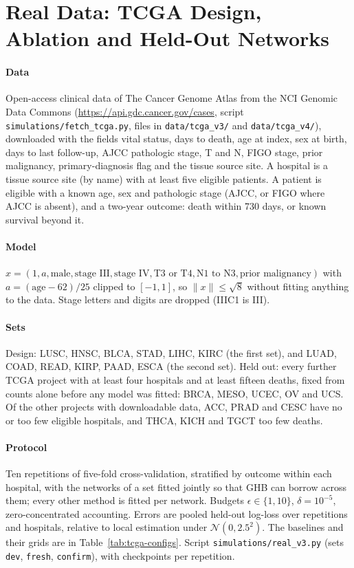 \documentclass[acmsmall,screen,nonacm]{acmart}
\theoremstyle{acmdefinition}
\begin{document}
\section{Real Data: TCGA Design, Ablation and Held-Out Networks}\label{sec:tcga}

\paragraph{Data} Open-access clinical data of The Cancer Genome Atlas \cite{weinstein2013cancer,grossman2016toward} from the NCI Genomic Data Commons (\url{https://api.gdc.cancer.gov/cases}, script \texttt{simulations/fetch\_tcga.py}, files in \texttt{data/tcga\_v3/} and \texttt{data/tcga\_v4/}), downloaded with the fields vital status, days to death, age at index, sex at birth, days to last follow-up, AJCC pathologic stage, T and N, FIGO stage, prior malignancy, primary-diagnosis flag and the tissue source site. A hospital is a tissue source site (by name) with at least five eligible patients. A patient is eligible with a known age, sex and pathologic stage (AJCC, or FIGO where AJCC is absent), and a two-year outcome: death within 730 days, or known survival beyond it.

\paragraph{Model} $x=(1,a,\text{male},\text{stage III},\text{stage IV},\text{T3 or T4},\text{N1 to N3},\text{prior malignancy})$ with $a=(\text{age}-62)/25$ clipped to $[-1,1]$, so $\|x\|\le\sqrt{8}$ without fitting anything to the data. Stage letters and digits are dropped (IIIC1 is III).

\paragraph{Sets} Design: LUSC, HNSC, BLCA, STAD, LIHC, KIRC (the first set), and LUAD, COAD, READ, KIRP, PAAD, ESCA (the second set). Held out: every further TCGA project with at least four hospitals and at least fifteen deaths, fixed from counts alone before any model was fitted: BRCA, MESO, UCEC, OV and UCS. Of the other projects with downloadable data, ACC, PRAD and CESC have no or too few eligible hospitals, and THCA, KICH and TGCT too few deaths.

\paragraph{Protocol} Ten repetitions of five-fold cross-validation, stratified by outcome within each hospital, with the networks of a set fitted jointly so that GHB can borrow across them; every other method is fitted per network. Budgets $\epsilon\in\{1,10\}$, $\delta=10^{-5}$, zero-concentrated accounting. Errors are pooled held-out log-loss over repetitions and hospitals, relative to local estimation under $\mathcal{N}(0,2.5^2)$. The baselines and their grids are in Table~\ref{tab:tcga-configs}. Script \texttt{simulations/real\_v3.py} (sets \texttt{dev}, \texttt{fresh}, \texttt{confirm}), with checkpoints per repetition.
\end{document}
